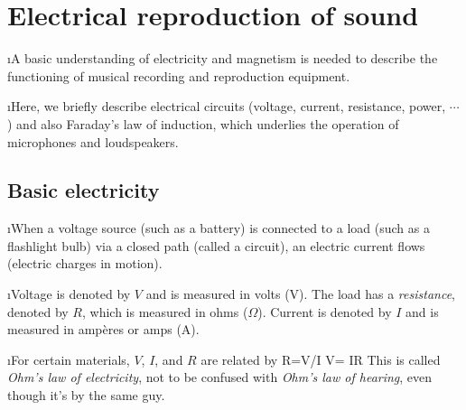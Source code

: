 \section{Electrical reproduction of sound}

\bi
\i A basic understanding of electricity and magnetism is 
needed to describe the functioning of musical recording 
and reproduction equipment.

\i Here, we briefly describe electrical circuits (voltage, current,
resistance, power, $\cdots$) and also Faraday's law of induction, 
which underlies the operation of microphones and loudspeakers.

\ei

\subsection{Basic electricity}

\bi

\i When a voltage source (such as a battery) is connected to a 
load (such as a flashlight bulb) via a closed path (called a
circuit), an electric current flows (electric charges in motion).

\i Voltage is denoted by $V$ and is measured in volts (V).
The load has a {\em resistance}, denoted by $R$, which is 
measured in ohms ($\Omega$).
Current is denoted by $I$ and is measured in amp\`eres or amps (A).

\i For certain materials, $V$, $I$, and $R$ are related by 
%
\be
R=V/I\quad 
V= IR
\ee
%
This is called {\em Ohm's law of electricity}, not to be confused
with {\em Ohm's law of hearing}, even though it's by the same guy.


